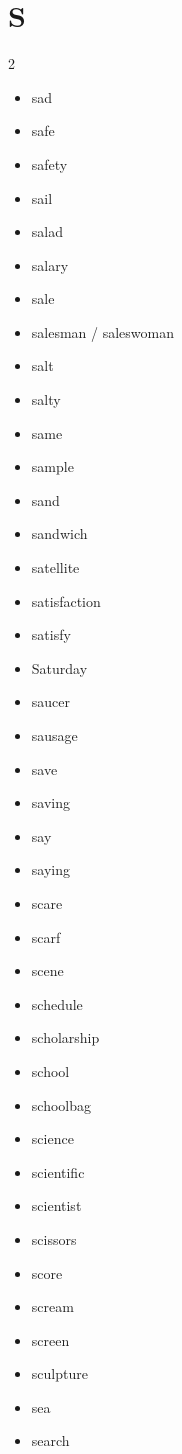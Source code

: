 \documentclass[../../book.tex]{subfiles}
\begin{document}
\section{S}
\raggedcolumns
\begin{multicols}{2}
\begin{itemize}
\item[-] sad
\item[-] safe
\item[-] safety
\item[-] sail
\item[-] salad
\item[-] salary
\item[-] sale
\item[-] salesman / saleswoman
\item[-] salt
\item[-] salty
\item[-] same
\item[-] sample
\item[-] sand
\item[-] sandwich
\item[-] satellite
\item[-] satisfaction
\item[-] satisfy
\item[-] Saturday
\item[-] saucer
\item[-] sausage
\item[-] save
\item[-] saving
\item[-] say
\item[-] saying
\item[-] scare
\item[-] scarf
\item[-] scene
\item[-] schedule
\item[-] scholarship
\item[-] school
\item[-] schoolbag
\item[-] science
\item[-] scientific
\item[-] scientist
\item[-] scissors
\item[-] score
\item[-] scream
\item[-] screen
\item[-] sculpture
\item[-] sea
\item[-] search

\end{itemize}
\end{multicols}
\end{document}
